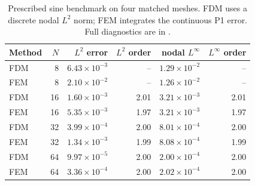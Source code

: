 \begin{table}[htbp]
\centering
\small
\setlength{\tabcolsep}{4pt}
\begin{tabular}{lrrrrr}
\toprule
Method & $N$ & $L^2$ error & $L^2$ order & nodal $L^\infty$ & $L^\infty$ order \\
\midrule
FDM & 8 & $6.43\times10^{-3}$ & -- & $1.29\times10^{-2}$ & -- \\
FEM & 8 & $2.10\times10^{-2}$ & -- & $1.26\times10^{-2}$ & -- \\
FDM & 16 & $1.60\times10^{-3}$ & 2.01 & $3.21\times10^{-3}$ & 2.01 \\
FEM & 16 & $5.35\times10^{-3}$ & 1.97 & $3.21\times10^{-3}$ & 1.97 \\
FDM & 32 & $3.99\times10^{-4}$ & 2.00 & $8.01\times10^{-4}$ & 2.00 \\
FEM & 32 & $1.34\times10^{-3}$ & 1.99 & $8.08\times10^{-4}$ & 1.99 \\
FDM & 64 & $9.97\times10^{-5}$ & 2.00 & $2.00\times10^{-4}$ & 2.00 \\
FEM & 64 & $3.36\times10^{-4}$ & 2.00 & $2.02\times10^{-4}$ & 2.00 \\
\bottomrule
\end{tabular}
\caption{Prescribed sine benchmark on four matched meshes. FDM uses a discrete nodal $L^2$ norm; FEM integrates the continuous P1 error. Full diagnostics are in .}
\label{tab:variable-sine}
\end{table}
